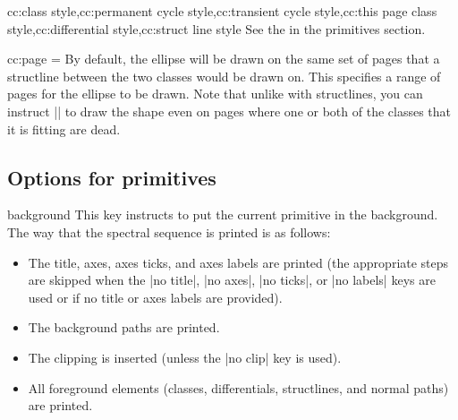 \begin{sseqdata}[|| name = ex1, cohomological Serre grading]
\begin{keylist}{cc:class style,cc:permanent cycle style,cc:transient cycle style,cc:this page class style,cc:differential style,cc:struct line style}
See the  in the \tikzpkg\space primitives section.
\end{keylist}

\begin{key}{cc:page = }
By default, the ellipse will be drawn on the same set of pages that a structline between the two classes would be drawn on. This specifies a range of pages for the ellipse to be drawn. Note that unlike with structlines, you can instruct |\circleclasses| to draw the shape even on pages where one or both of the classes that it is fitting are dead.
\end{key}

\subsection{Options for \tikzpkg\space primitives}
\begin{key}{background}
This key instructs \sseqpages\space to put the current \tikzpkg\space primitive in the background. The way that the spectral sequence is printed is as follows:
\begin{itemize}
\item The title, axes, axes ticks, and axes labels are printed (the appropriate steps are skipped when the |no title|, |no axes|, |no ticks|, or |no labels| keys are used or if no title or axes labels are provided).

\item The \tikzpkg\space background paths are printed.

\item The clipping is inserted (unless the |no clip| key is used).

\item All foreground elements (classes, differentials, structlines, and normal \tikzpkg\space paths) are printed.
\end{itemize}


\end{key}
\end{sseqdata}
